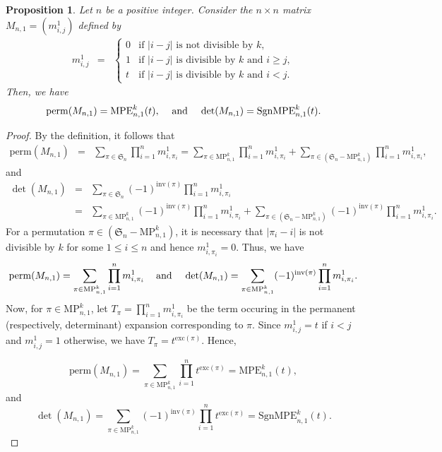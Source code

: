 \documentclass[12pt]{article}
\newcommand{\Perm}{\mathrm{perm}}
\newcommand{\MP}{\mathrm{MP}}
\newcommand{\MPE}{\mathrm{MPE}}
\newcommand{\SMPE}{\mathrm{SgnMPE}}
\newcommand{\SSS}{\mathfrak{S}}
\newcommand{\inv}{\mathrm{inv}}
\newcommand{\exc}{\mathrm{exc}}
\newtheorem{proposition}[lemma]{\bf Proposition}
\begin{document}
\begin{proposition}
\label{prop:mn1}
Let $n$ be a positive integer.  Consider the $n \times n$ matrix $M_{n,1}= (m^1_{i,j})$ defined by
\begin{eqnarray*}
m^1_{i,j} & = & \begin{cases}
0 & \text {if $|i-j|$ is not divisible by $k$}, \\
1 & \text {if $|i-j|$ is divisible by $k$ and $i \geq j$},\\
 t & \text {if $|i-j|$ is divisible by $k$ and $i < j$}. 
 \end{cases}
\end{eqnarray*} 
Then, we have
\[\Perm(M_{n,1})=\MPE_{n,1}^k(t), \hspace{3 mm}  
\mbox{ and } 
\hspace{3 mm}
\det(M_{n,1})=\SMPE_{n,1}^k(t).\]
\end{proposition}

\begin{proof} 
By the definition, it follows that 
\begin{eqnarray*}
  \Perm(M_{n,1}) & = & \displaystyle  \sum _{\pi \in \SSS_n}  \prod _{i=1}^n m^1_{i,\pi_i}  =  \displaystyle  \sum _{\pi \in \MP_{n,1}^k}  \prod _{i=1}^n m^1_{i,\pi_i} + \displaystyle  \sum _{\pi \in (\SSS_n - \MP_{n,1}^k)}  \prod _{i=1}^n m^1_{i,\pi_i}, 
  \end{eqnarray*}
  and
  \begin{eqnarray*}
  \det(M_{n,1}) & = & \displaystyle  \sum _{\pi \in \SSS_n} (-1)^{\inv(\pi)} \prod _{i=1}^n m^1_{i,\pi_i} \\
  & = & \displaystyle  \sum _{\pi \in \MP_{n,1}^k} (-1)^{\inv(\pi)} \prod _{i=1}^n m^1_{i,\pi_i} + \displaystyle  \sum _{\pi \in (\SSS_n - \MP_{n,1}^k)} (-1)^{\inv(\pi)} \prod _{i=1}^n m^1_{i,\pi_i}. 
  \end{eqnarray*}
For a permutation $\pi \in (\SSS_n- \MP_{n,1}^k)$, it is necessary that $|\pi_i-i|$ is not divisible by $k$ for some $1 \leq i \leq n$ and hence $m^1_{i,\pi_i}=0$. Thus, we have 
\[ \Perm(M_{n,1}) =  \displaystyle  \sum _{\pi \in \MP_{n,1}^k}  \prod _{i=1}^n m^1_{i,\pi_i} \hspace{3 mm} \mbox{ and } \hspace{3 mm} \det(M_{n,1}) =  \displaystyle  \sum _{\pi \in \MP_{n,1}^k} (-1)^{\inv(\pi)} \prod _{i=1}^n m^1_{i,\pi_i}.\] 
Now, for $\pi \in \MP_{n,1}^k$, let $T_{\pi} = \prod _{i=1}^n m^1_{i, \pi_i}$ be the term occuring in the permanent (respectively, determinant) expansion corresponding to $\pi$. Since $m^1_{i,j}=t$ if $i < j$ and $m^1_{i,j}=1$ otherwise, we have $T_{\pi} = t^{\exc(\pi) }$. Hence, 

\[ \Perm(M_{n,1})= \displaystyle  \sum _{\pi \in \MP_{n,1}^k}  \prod _{i=1}^n t^{\exc(\pi)} = \MPE_{n,1}^k(t),\]
and 
\[ \det(M_{n,1}) =  \displaystyle  \sum _{\pi \in \MP_{n,1}^k} (-1)^{\inv(\pi)} \prod _{i=1}^n t^{\exc(\pi)} = \SMPE_{n,1}^k(t) .\]  
\end{proof}
\end{document}
